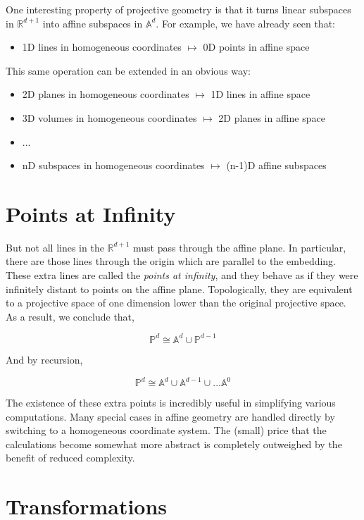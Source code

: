 \documentclass{article}[11pt]
\begin{document}
One interesting property of projective geometry is that it turns linear subspaces in $\mathbb{R}^{d+1}$ into affine subspaces in $\mathbb{A}^d$.  For example, we have already seen that:

\begin{itemize}
\item 1D lines in homogeneous coordinates $\mapsto$ 0D points in affine space
\end{itemize}

This same operation can be extended in an obvious way:

\begin{itemize}
\item 2D planes in homogeneous coordinates $\mapsto$ 1D lines in affine space
\item 3D volumes in homogeneous coordinates $\mapsto$ 2D planes in affine space
\item ...
\item nD subspaces in homogeneous coordinates $\mapsto$ (n-1)D affine subspaces
\end{itemize}

\section{Points at Infinity}

But not all lines in the $\mathbb{R}^{d+1}$ must pass through the affine plane.  In particular, there are those lines through the origin which are parallel to the embedding.  These extra lines are called the \emph{points at infinity}, and they behave as if they were infinitely distant to points on the affine plane.  Topologically, they are equivalent to a projective space of one dimension lower than the original projective space.  As a result, we conclude that,

\[ \mathbb{P}^d \cong \mathbb{A}^d \cup \mathbb{P}^{d-1} \]

And by recursion,

\[ \mathbb{P}^d \cong \mathbb{A}^d \cup \mathbb{A}^{d-1} \cup ... \mathbb{A}^0 \]

The existence of these extra points is incredibly useful in simplifying various computations.  Many special cases in affine geometry are handled directly by switching to a homogeneous coordinate system.  The (small) price that the calculations become somewhat more abstract is completely outweighed by the benefit of reduced complexity.

\section{Transformations}
\end{document}
